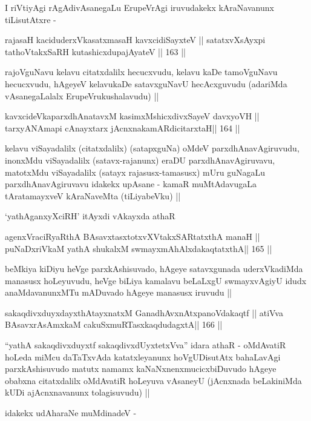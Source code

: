\begin{artha}
I riVtiyAgi rAgAdivAsanegaLu ErupeVrAgi iruvudakekx kAraNavanunx
tiLisutAtxre -
\end{artha}

\begin{shl}
rajasaH kaciduderxVkasatxmasaH kavxcidiSayxteV ||
satatxvXsAyxpi tathoVtakxSaRH kutashicxdupajAyateV ||  163 ||
\end{shl}

\begin{artha}
rajoVguNavu kelavu citatxdalilx hecucxvudu, kelavu kaDe tamoVguNavu
hecucxvudu, hAgeyeV kelavukaDe satavxguNavU hecAcxguvudu (adariMda
vAsanegaLalalx ErupeVrukushalavudu) ||
\end{artha}

\begin{shl}
kavxcideVkaparxdhAnatavxM kasimxMshicxdivxSayeV davxyoVH ||
tarxyANAmapi cAnayxtarx jAcnxnakamARdicitarxtaH\hfill || 164 ||
\end{shl}

\begin{artha}
kelavu viSayadalilx (citatxdalilx) (satapxguNa) oMdeV
parxdhAnavAgiruvudu, inonxMdu viSayadalilx (satavx-rajanunx) eraDU
parxdhAnavAgiruvavu, matotxMdu viSayadalilx (satayx rajasusx-tamasusx)
mUru guNagaLu parxdhAnavAgiruvavu idakekx upAsane - kamaR
muMtAdavugaLa tAratamayxveV kAraNaveMta (tiLiyabeVku) ||

`yathA\s ganxyXciRH' itAyxdi vAkayxda athaR
\end{artha}

\begin{shl}
agenxVraciRyaRthA BAsavxtasxtotxvXVtakxSARtatxthA manaH ||
puNaDxriVkaM yathA shukalxM swmayxmAhAlxdakaqtatxthA\hfill || 165 ||
\end{shl}

\begin{artha}
beMkiya kiDiyu heVge parxkAshisuvado, hAgeye satavxgunada
uderxVkadiMda manasusx hoLeyuvudu, heVge biLiya kamalavu beLaLxgU
swmayxvAgiyU idudx anaMdavanunxMTu mADuvado hAgeye manasusx iruvudu ||
\end{artha}

\begin{shl}
sakaqdivxduyxdayxthA\s tayxnatxM GanadhAvxnAtxpanoVdakaqtf ||
atiVva BAsavxrA\s sAmxkaM cakuSxmuRTasxkaqdudagxtA\hfill || 166 ||
\end{shl}

\begin{artha}
``yathA sakaqdivxduyxtf sakaqdivxdUyxtetxVva'' idara athaR -
oMdAvatiR hoLeda miMcu daTaTxvAda katatxleyanunx hoVgUDisutAtx
bahaLavAgi parxkAshisuvudo matutx namamx kaNaNxnenxmucicxbiDuvudo
hAgeye obabxna citatxdalilx oMdAvatiR hoLeyuva vAsaneyU (jAcnxnada
beLakiniMda kUDi ajAcnxnavanunx tolagisuvudu) ||

idakekx udAharaNe muMdinadeV -
\end{artha}

